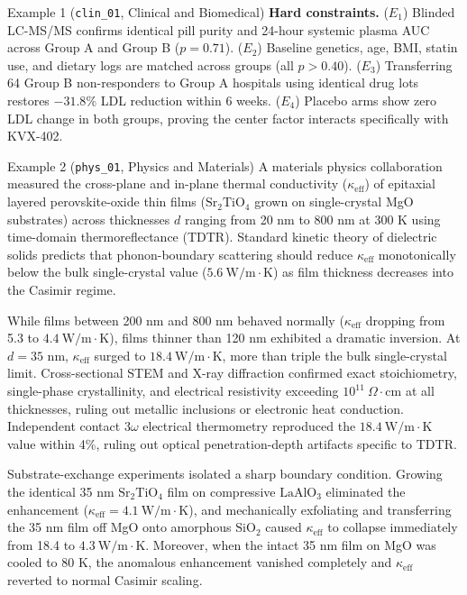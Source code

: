 \documentclass{article}
\begin{document}
\begin{scenariobox}{Example 1 (\texttt{clin\_01}, Clinical and Biomedical)}
\textbf{Hard constraints.}
($E_1$) Blinded LC-MS/MS confirms identical pill purity and 24-hour systemic plasma AUC across Group A and Group B ($p = 0.71$).
($E_2$) Baseline genetics, age, BMI, statin use, and dietary logs are matched across groups (all $p > 0.40$).
($E_3$) Transferring 64 Group B non-responders to Group A hospitals using identical drug lots restores $-31.8\%$ LDL reduction within 6 weeks.
($E_4$) Placebo arms show zero LDL change in both groups, proving the center factor interacts specifically with KVX-402.
\end{scenariobox}

\begin{scenariobox}{Example 2 (\texttt{phys\_01}, Physics and Materials)}
A materials physics collaboration measured the cross-plane and in-plane thermal conductivity ($\kappa_{\mathrm{eff}}$) of epitaxial layered perovskite-oxide thin films ($\mathrm{Sr_2TiO_4}$ grown on single-crystal MgO substrates) across thicknesses $d$ ranging from 20 nm to 800 nm at 300 K using time-domain thermoreflectance (TDTR). Standard kinetic theory of dielectric solids predicts that phonon-boundary scattering should reduce $\kappa_{\mathrm{eff}}$ monotonically below the bulk single-crystal value ($5.6\ \mathrm{W/m\cdot K}$) as film thickness decreases into the Casimir regime.

While films between 200 nm and 800 nm behaved normally ($\kappa_{\mathrm{eff}}$ dropping from 5.3 to $4.4\ \mathrm{W/m\cdot K}$), films thinner than 120 nm exhibited a dramatic inversion. At $d = 35$ nm, $\kappa_{\mathrm{eff}}$ surged to $18.4\ \mathrm{W/m\cdot K}$, more than triple the bulk single-crystal limit. Cross-sectional STEM and X-ray diffraction confirmed exact stoichiometry, single-phase crystallinity, and electrical resistivity exceeding $10^{11}\ \Omega\cdot\mathrm{cm}$ at all thicknesses, ruling out metallic inclusions or electronic heat conduction. Independent contact $3\omega$ electrical thermometry reproduced the $18.4\ \mathrm{W/m\cdot K}$ value within 4\%, ruling out optical penetration-depth artifacts specific to TDTR.

Substrate-exchange experiments isolated a sharp boundary condition. Growing the identical 35 nm $\mathrm{Sr_2TiO_4}$ film on compressive $\mathrm{LaAlO_3}$ eliminated the enhancement ($\kappa_{\mathrm{eff}} = 4.1\ \mathrm{W/m\cdot K}$), and mechanically exfoliating and transferring the 35 nm film off MgO onto amorphous $\mathrm{SiO_2}$ caused $\kappa_{\mathrm{eff}}$ to collapse immediately from 18.4 to $4.3\ \mathrm{W/m\cdot K}$. Moreover, when the intact 35 nm film on MgO was cooled to 80 K, the anomalous enhancement vanished completely and $\kappa_{\mathrm{eff}}$ reverted to normal Casimir scaling.


\end{scenariobox}
\end{document}
